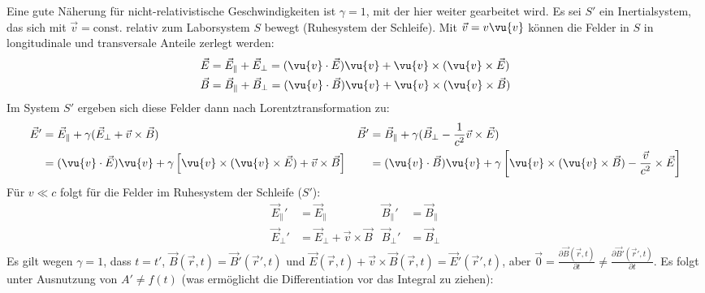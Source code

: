 			  Eine gute Näherung für nicht-relativistische Geschwindigkeiten ist {$\gamma = 1$}, mit der hier weiter gearbeitet wird. Es sei $S'$ ein Inertialsystem, das sich mit $\vec{v}=\text{const.}$ relativ zum Laborsystem $S$ bewegt (Ruhesystem der Schleife). Mit $\vec{v} = v \vu{v}$ können die Felder in $S$ in longitudinale und transversale Anteile zerlegt werden:
			        \begin{align}
				        \vec{E} & = \vec{E}_\parallel + \vec{E}_\perp = (\vu{v} \cdot \vec{E}) \vu{v} + \vu{v} \times (\vu{v} \times \vec{E})     \\
				        \vec{B} & = \vec{B} _\parallel + \vec{B} _\perp = (\vu{v} \cdot \vec{B} ) \vu{v} + \vu{v} \times (\vu{v} \times \vec{B} )
			        \end{align}
			  Im System $S'$ ergeben sich diese Felder dann nach Lorentztransformation zu:
			        \begin{align}
				        \vec{E}' & = \vec{E}_\parallel + \gamma ( \vec{E}_\perp + \vec{v} \times \vec{B} )                                                             & \vec{B} ' & = \vec{B} _\parallel + \gamma ( \vec{B} _\perp - \frac{1}{c^2}\vec{v} \times \vec{E})\label{allglorentz} \\
				                 & = (\vu{v} \cdot \vec{E}) \vu{v} + \gamma \left[\vu{v} \times (\vu{v} \times \vec{E}) + \vec{v} \times \vec{B}  \right]              &
				                 & = (\vu{v} \cdot \vec{B} ) \vu{v} + \gamma \left[\vu{v} \times (\vu{v} \times \vec{B} ) - \frac{\vec{v}}{c^2} \times \vec{E} \right] \nonumber
			        \end{align}
			  Für $v \ll c$ folgt für die Felder im Ruhesystem der Schleife ($S'$):
			        \begin{align}
				        \vec{E}_\parallel' & = \vec{E}_\parallel                      & \vec{B} _\parallel' & = \vec{B} _\parallel \\
				        \vec{E}_\perp'     & = \vec{E}_\perp + \vec{v} \times \vec{B} & \vec{B} _\perp'     & = \vec{B} _\perp
			        \end{align}
			   Es gilt wegen $\gamma=1$, dass $t=t'$, $\vec{B}(\vec{r},t)=\vec{B}'(\vec{r}',t)$ und $\vec{E}(\vec{r},t)+\vec{v}\times\vec{B}(\vec{r},t)=\vec{E}'(\vec{r}',t)$, aber $\vec{0}=\frac{\partial\vec{B}(\vec{r},t)}{\partial t}\neq\frac{\partial\vec{B}'(\vec{r}',t)}{\partial t} $. Es folgt unter Ausnutzung von $A'\neq f(t)$ (was ermöglicht die Differentiation vor das Integral zu ziehen):
